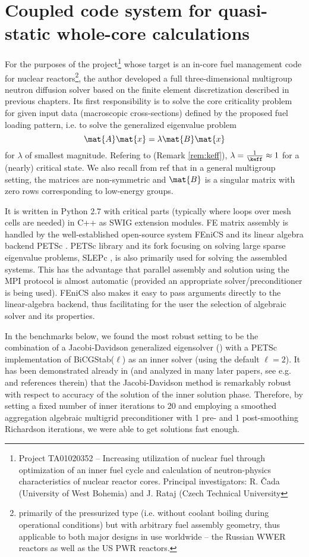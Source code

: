 \chapter{Coupled code system for quasi-static whole-core calculations}\label{chap:coupled}

For the purposes of the project\footnote{
Project TA01020352 -- Increasing utilization of nuclear fuel through optimization of an inner fuel cycle and
calculation of neutron-physics characteristics of nuclear reactor cores. Principal investigators: R. {\v C}ada
(University of West Bohemia) and J. Rataj (Czech Technical University} 
whose target is an in-core fuel management code for nuclear
reactors\footnote{ primarily of the pressurized type (i.e. without coolant boiling during operational conditions) but with arbitrary fuel
assembly geometry, thus applicable to both major designs in use worldwide -- the Russian WWER reactors as well as the
US PWR reactors.}, the author developed a full three-dimensional multigroup neutron diffusion solver based on the finite
element discretization described in previous chapters. Its first responsibility is to solve the core criticality problem
for given input data (macroscopic cross-sections) defined by the proposed fuel loading pattern, i.e. to solve the
generalized eigenvalue problem
$$
	\mat{A}\mat{x} = \lambda\mat{B}\mat{x}
$$
for $\lambda$ of smallest magnitude. Refering to  (Remark \ref{rem:keff}), $\lambda =
\frac{1}{\keff} \approx 1$ for a (nearly) critical state. We also recall from \alert{ref} that in a general multigroup
setting, the matrices are non-symmetric and $\mat{B}$ is a singular matrix with zero rows corresponding to low-energy
groups.

It is written in Python 2.7 with critical parts (typically where loops over mesh cells are needed) in C++ as SWIG
extension modules. FE matrix assembly is handled by the well-established open-source system FEniCS \cite{dolfin1,
dolfin2} and its linear algebra backend PETSc \cite{petsc1}. PETSc library and its fork focusing on solving large sparse
eigenvalue problems, SLEPc \cite{slepc1}, is also primarily used for solving the assembled systems. This has the
advantage that parallel assembly and solution using the MPI protocol is almost automatic (provided an appropriate
solver/preconditioner is being used).
FEniCS also makes it easy to pass arguments directly to the linear-algebra backend, thus facilitating for the user the
selection of algebraic solver and its properties. 

In the benchmarks below, we found the most robust setting to be the combination of a Jacobi-Davidson generalized
eigensolver (\cite{slepcjd}) with a PETSc implementation of BiCGStab($\ell$) \cite{Sleijpen1} as an inner solver (using
the default $\ell = 2$). It has been demonstrated already in \cite{Sleijpen1} (and analyzed in many later papers, see
e.g.  and references therein) that the Jacobi-Davidson method is remarkably robust with respect to accuracy
of the solution of the inner solution phase. Therefore, by setting a fixed number of inner iterations to 20 and
employing a smoothed aggregation algebraic multigrid preconditioner with 1 pre- and 1 post-smoothing Richardson
iterations, we were able to get solutions fast enough.
